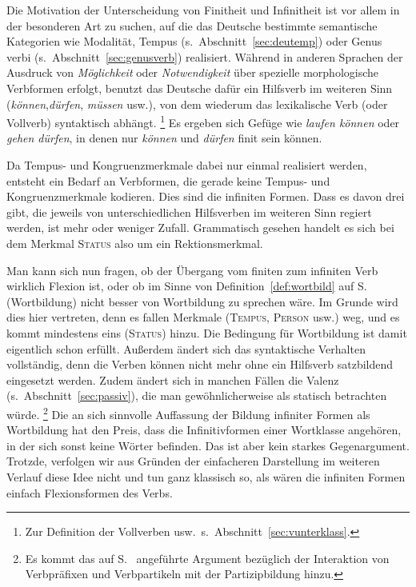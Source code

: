 \begin{exe}
\end{exe}

Die Motivation der Unterscheidung von Finitheit und Infinitheit ist vor allem in der besonderen Art zu suchen, auf die das Deutsche bestimmte semantische Kategorien wie Modalität, Tempus (s.\ Abschnitt~\ref{sec:deutemp}) oder Genus verbi (s.\ Abschnitt~\ref{sec:genusverb}) realisiert.
Während in anderen Sprachen \zB der Ausdruck von \textit{Möglichkeit} oder \textit{Notwendigkeit} über spezielle morphologische Verbformen erfolgt, benutzt das Deutsche dafür ein Hilfsverb im weiteren Sinn (\textit{können},\textit{dürfen}, \textit{müssen} usw.), von dem wiederum das lexikalische Verb (oder Vollverb) syntaktisch abhängt.%
\footnote{Zur Definition der Vollverben usw.\ s.\ Abschnitt~\ref{sec:vunterklass}.}
Es ergeben sich Gefüge wie \textit{laufen können} oder \textit{gehen dürfen}, in denen nur \textit{können} und \textit{dürfen} finit sein können.

Da Tempus- und Kongruenzmerkmale dabei nur einmal realisiert werden, entsteht ein Bedarf an Verbformen, die gerade keine Tempus- und Kongruenzmerkmale kodieren.
Dies sind die infiniten Formen.
Dass es davon drei gibt, die jeweils von unterschiedlichen Hilfsverben im weiteren Sinn regiert werden, ist mehr oder weniger Zufall.
Grammatisch gesehen handelt es sich bei dem Merkmal \textsc{Status} also um ein Rektionsmerkmal.

\label{abs:infinwortbild}Man kann sich nun fragen, ob der Übergang vom finiten zum infiniten Verb wirklich Flexion ist, oder ob im Sinne von Definition~\ref{def:wortbild} auf S.~\pageref{def:wortbild} (Wortbildung) nicht besser von Wortbildung zu sprechen wäre.
Im Grunde wird dies hier vertreten, denn es fallen Merkmale (\textsc{Tempus}, \textsc{Person} usw.) weg, und es kommt mindestens eins (\textsc{Status}) hinzu.
Die Bedingung für Wortbildung ist damit eigentlich schon erfüllt.
Außerdem ändert sich das syntaktische Verhalten vollständig, denn die Verben können nicht mehr ohne ein Hilfsverb satzbildend eingesetzt werden.
Zudem ändert sich in manchen Fällen die Valenz (s.\ Abschnitt~\ref{sec:passiv}), die man gewöhnlicherweise als statisch betrachten würde.%
\footnote{Es kommt das auf S.\ \pageref{abs:praefixundflex} angeführte Argument bezüglich der Interaktion von Verbpräfixen und Verbpartikeln mit der Partizipbildung hinzu.}
Die an sich sinnvolle Auffassung der Bildung infiniter Formen als Wortbildung hat den Preis, dass die Infinitivformen einer Wortklasse angehören, in der sich sonst keine Wörter befinden.
Das ist aber kein starkes Gegenargument. 
Trotzde, verfolgen wir aus Gründen der einfacheren Darstellung im weiteren Verlauf diese Idee nicht und tun ganz klassisch so, als wären die infiniten Formen einfach Flexionsformen des Verbs.


